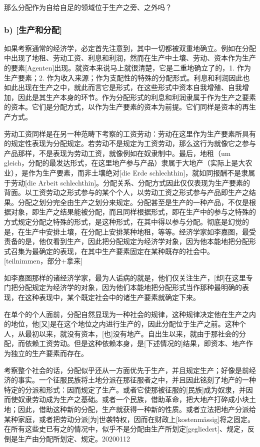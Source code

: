 \documentclass[a4paper,twoside,12pt]{ctexart}
\begin{document}
那么分配作为自给自足的领域位于生产之旁、之外吗？

\subsubsection{b) [生产和分配]}
如果考察通常的经济学，必定首先注意到，其中一切都被双重地确立。例如在分配中出现了地租、劳动工资、利息和利润，然而在生产中土壤、劳动、资本作为生产的要素[Agenten]出现。就资本来说马上就很清楚，它是二重地确立了的，1. 作为生产要素；2. 作为收入来源；作为支配性的特殊的分配形式。利息和利润因此也如此出现在生产之中，就此而言它是形式，在这些形式中资本自我增殖、自我增加，因此是其生产本身的环节。作为分配形式的利息和利润隶属于作为生产之要素的资本。它们是分配方式，以作为生产要素的资本为前提。它们同样是资本的再生产方式。

劳动工资同样是在另一种范畴下考察的工资劳动：劳动在这里作为生产要素所具有的规定性表现为分配规定。若劳动不是规定为工资劳动，那么这行为就像它之参与产品那样，不是表现为劳动工资，就像例如在奴隶制中。最后，地租（um gleich，分配的最发达形式，在这里地产参与产品）隶属于大地产（实际上是大农业），是作为生产要素，而非土壤绝对[die Erde schlechthin]，就如同报酬不是隶属于劳动[die Arbeit schlechthin]。分配关系、分配方式因此仅仅表现为生产要素的背面。以工资劳动之形式参与的某个个人，以劳动工资之形式参与产品即生产之结果。分配之划分完全由生产之划分来规定。分配甚至是生产的一种产品，不仅是根据对象，即生产之结果能被分配，而且同样根据形式，即在生产中的参与之特殊的方式规定分配之特殊的形式，是这种形式，在其中得以参与分配。彻底是幻觉的是，在生产中安排土壤，在分配上安排某种地租，等等。经济学家如李嘉图，最受责备的是，他仅看到生产，因此把分配规定为经济学对象，因为他本能地把分配形式召集为最确定的表现，在其中生产要素固定在某种既存的社会中。[teilnimmen，部分+拿来]

如李嘉图那样的诸经济学家，最为人诟病的就是，他们仅关注生产，[却]在这里专门把分配规定为经济学的对象，因为他们本能地把分配形式当作那种最明确的表现，在这种表现中，某个既定社会中的诸生产要素就确定下来。

在单个的个人面前，分配自然显现为一种社会的规律，这种规律决定他在生产之内的地位，他[又]是在这个地位之内进行生产的，因此分配位于生产之前。这种个人，从最初以来，就没有资本，[也]没有地产。自出生以来，就由于那社会的分配，而依赖工资劳动。但是这种依赖本身，是[下述情况的]结果，即资本、地产作为独立的生产要素而存在。

考察整个社会的话，分配似乎还从一方面优先于生产，并且规定生产；好像是前经济的事实。一个征服民族将土地分派在那征服者之中，并且因此铭刻了地产的一种特定的分派和形式：因而规定了生产。或者它使那被征服的[民族]成为奴隶，并因而使奴隶劳动成为生产之基础。或者一个民族，借助革命，把大地产打碎成小块土地；因此，借助这种新的分配，生产就获得一种新的性质。或者立法把地产分派给某种家庭，或者把劳动分派[为]世袭特权，因而在财政上[kostenmässig]将之固定。在所有这些史已有之的情况中，似乎不是分配由生产所划定[gegliedert]、规定，反倒是生产由分配所划定、规定。20200112
\end{document}
